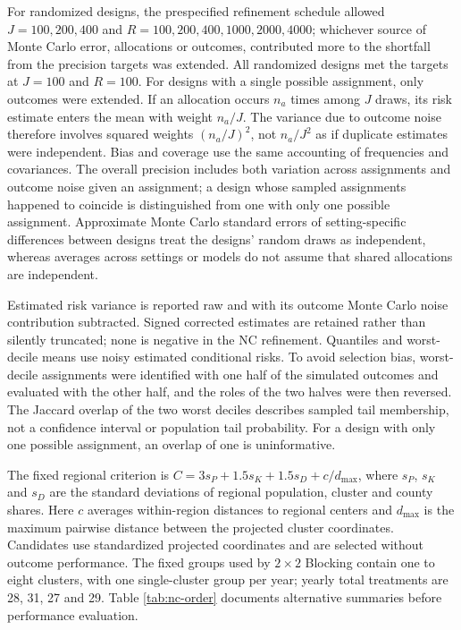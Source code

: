 \documentclass[11pt]{article}
\begin{document}
For randomized designs, the prespecified refinement schedule allowed $J=100,200,400$ and $R=100,200,400,1000,2000,4000$; whichever source of Monte Carlo error, allocations or outcomes, contributed more to the shortfall from the precision targets was extended. All randomized designs met the targets at $J=100$ and $R=100$. For designs with a single possible assignment, only outcomes were extended. If
an allocation occurs \(n_a\) times among \(J\) draws, its risk estimate
enters the mean with weight \(n_a/J\). The variance due to outcome noise therefore involves squared weights \((n_a/J)^2\), not \(n_a/J^2\) as if
duplicate estimates were independent. Bias and coverage use the same accounting of frequencies and covariances. The overall precision includes both variation across assignments and outcome noise given an assignment; a design whose sampled assignments happened to coincide is distinguished from one with only one possible assignment. Approximate Monte Carlo standard errors of setting-specific differences between designs treat the designs' random draws as independent, whereas averages across settings or models do not assume that shared allocations are independent.

Estimated risk variance is reported raw and with its outcome Monte Carlo
noise contribution subtracted. Signed corrected estimates are retained
rather than silently truncated; none is negative in the NC refinement.
Quantiles and worst-decile means use noisy estimated conditional risks.
To avoid selection bias, worst-decile assignments were identified with one half of the simulated outcomes and evaluated with the other half, and the roles of the two halves were then reversed. The Jaccard overlap of the two worst deciles describes sampled tail membership, not a confidence interval or population tail probability. For a design with only one possible assignment, an overlap of one is uninformative.

The fixed regional criterion is \(C=3s_P+1.5s_K+1.5s_D+c/d_{\max}\), where \(s_P\), \(s_K\) and \(s_D\) are the standard deviations of regional population, cluster and county shares. Here \(c\) averages within-region distances to regional centers and \(d_{\max}\) is the maximum pairwise distance between the projected cluster coordinates. Candidates use standardized projected coordinates and are selected
without outcome performance. The fixed groups used by $2\times2$ Blocking contain one to eight clusters, with one single-cluster group per year; yearly total treatments are 28, 31, 27 and 29.
Table \ref{tab:nc-order} documents alternative summaries before
performance evaluation.
\end{document}
